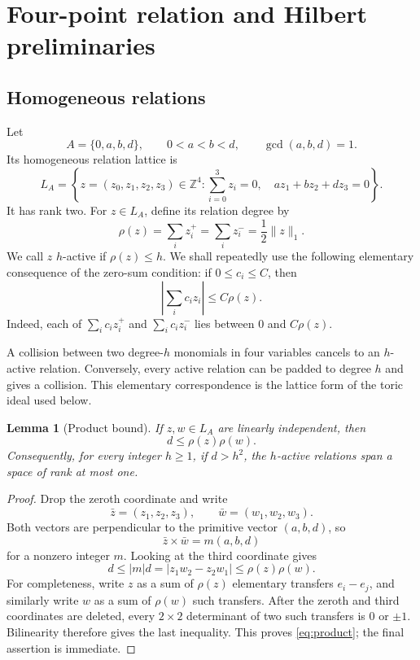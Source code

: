 \documentclass[11pt,reqno]{amsart}
\newtheorem{lemma}[theorem]{Lemma}
\theoremstyle{definition}
\theoremstyle{remark}
\newcommand{\Z}{\mathbb Z}
\begin{document}
\section{Four-point relation and Hilbert preliminaries}\label{sec:relations}

\subsection{Homogeneous relations}

Let
\[
 A=\{0,a,b,d\},\qquad 0<a<b<d,\qquad \gcd(a,b,d)=1.
\]
Its homogeneous relation lattice is
\begin{equation}\label{eq:lattice}
 L_A=\left\{z=(z_0,z_1,z_2,z_3)\in\Z^4:
 \sum_{i=0}^3z_i=0,\quad az_1+bz_2+dz_3=0\right\}.
\end{equation}
It has rank two.  For $z\in L_A$, define its relation degree by
\begin{equation}\label{eq:rho}
 \rho(z)=\sum_i z_i^+=\sum_i z_i^-=\frac12\|z\|_1.
\end{equation}
We call $z$ $h$-active if $\rho(z)\leq h$.
We shall repeatedly use the following elementary consequence of the zero-sum
condition: if $0\leq c_i\leq C$, then
\begin{equation}\label{eq:weighteddegree}
 \left|\sum_i c_i z_i\right|\leq C\rho(z).
\end{equation}
Indeed, each of $\sum_i c_i z_i^+$ and $\sum_i c_i z_i^-$ lies between
$0$ and $C\rho(z)$.

A collision between two degree-$h$ monomials in four variables cancels to
an $h$-active relation.  Conversely, every active relation can be padded
to degree $h$ and gives a collision.  This elementary correspondence is
the lattice form of the toric ideal used below.

\begin{lemma}[Product bound]\label{lem:product}
If $z,w\in L_A$ are linearly independent, then
\begin{equation}\label{eq:product}
 d\leq \rho(z)\rho(w).
\end{equation}
Consequently, for every integer $h\geq1$, if $d>h^2$, the $h$-active
relations span a space of rank at most one.
\end{lemma}

\begin{proof}
Drop the zeroth coordinate and write
\[
 \bar z=(z_1,z_2,z_3),\qquad \bar w=(w_1,w_2,w_3).
\]
Both vectors are perpendicular to the primitive vector $(a,b,d)$, so
\[
 \bar z\times\bar w=m(a,b,d)
\]
for a nonzero integer $m$.  Looking at the third coordinate gives
\[
 d\leq |m|d=|z_1w_2-z_2w_1|
 \leq\rho(z)\rho(w).
\]
For completeness, write $z$ as a sum of $\rho(z)$ elementary transfers
$e_i-e_j$, and similarly write $w$ as a sum of $\rho(w)$ such transfers.
After the zeroth and third coordinates are deleted, every $2\times2$
determinant of two such transfers is $0$ or $\pm1$.  Bilinearity therefore
gives the last inequality.  This
proves \eqref{eq:product}; the final assertion is immediate.
\end{proof}
\end{document}
